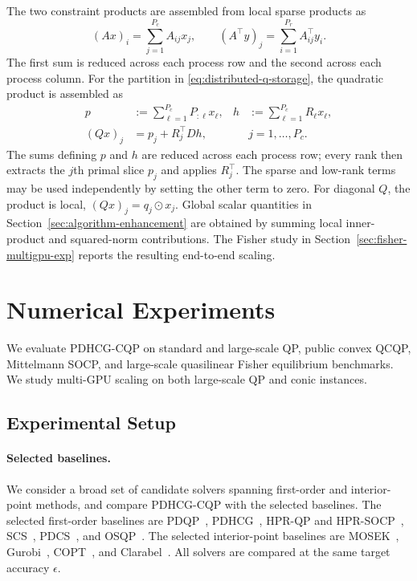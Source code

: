 \documentclass[letterpaper]{article} %
\newcommand{\name}{PDHCG-CQP\xspace}
\theoremstyle{definition}
\theoremstyle{remark}
\begin{document}
The two constraint products are assembled from local sparse products as
\begin{equation}
\label{eq:distributed-products}
    (Ax)_i=\sum_{j=1}^{P_c}A_{ij}x_j,
    \qquad
    (A^\top y)_j=\sum_{i=1}^{P_r}A_{ij}^\top y_i.
\end{equation}
The first sum is reduced across each process row and the second across each
process column. For the partition in
\eqref{eq:distributed-q-storage}, the quadratic product is assembled as
\begin{equation}
\label{eq:distributed-q-product}
\begin{aligned}
    p&:=\sum_{\ell=1}^{P_c}P_{:\ell}x_\ell,
    &h&:=\sum_{\ell=1}^{P_c}R_\ell x_\ell,\\
    (Qx)_j&=p_j+R_j^\top D h,
    &&j=1,\ldots,P_c.
\end{aligned}
\end{equation}
The sums defining $p$ and $h$ are reduced across each process row; every rank
then extracts the $j$th primal slice $p_j$ and applies $R_j^\top$. The sparse and
low-rank terms may be used independently by setting the other term to zero.
For diagonal $Q$, the product is local,
$(Qx)_j=q_j\odot x_j$. Global scalar quantities in
Section~\ref{sec:algorithm-enhancement} are obtained by summing local
inner-product and squared-norm contributions. The Fisher study in
Section~\ref{sec:fisher-multigpu-exp} reports the resulting end-to-end scaling.


\section{Numerical Experiments}
\label{sec:experiments}

We evaluate \name on standard and large-scale QP, public convex QCQP,
Mittelmann SOCP, and large-scale quasilinear Fisher equilibrium benchmarks.
We study multi-GPU scaling on both large-scale QP and conic instances.

\subsection{Experimental Setup}
\label{sec:exp-setup}

\paragraph{Selected baselines.}
We consider a broad set of candidate solvers spanning first-order and
interior-point methods, and compare \name with the selected baselines. The
selected first-order baselines are PDQP~\cite{lu2023practical},
PDHCG~\cite{huang2025restarted}, HPR-QP and HPR-SOCP~\cite{chen2025hpr},
SCS~\cite{o2016conic,scs}, PDCS~\cite{lin2025pdcs}, and
OSQP~\cite{stellato2020osqp}. The selected interior-point baselines are
MOSEK~\cite{mosek2025manual}, Gurobi~\cite{gurobi2024manual},
COPT~\cite{ge2022cardinal}, and Clarabel~\cite{goulart2024clarabel}. All
solvers are compared at the same target accuracy $\epsilon$.
\end{document}
